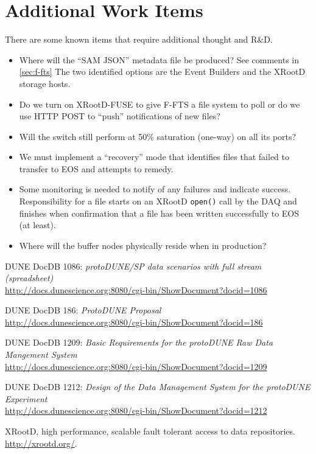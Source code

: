 \documentclass[pdftex,12pt,letter]{article}
\newcommand{\xrd}{XRootD\xspace}
\begin{document}
\section{Additional Work Items}
There are some known items that require additional thought and R\&D.
\begin{itemize}
\item Where will the ``SAM JSON'' metadata file be produced?  See comments in \ref{sec:f-fts}
The two   identified options are the Event Builders and the \xrd storage  hosts.  
\item Do we turn on \xrd-FUSE to give F-FTS a file system to poll or
  do we use HTTP POST to ``push'' notifications of new files?
\item Will the switch still perform at 50\% saturation (one-way) on
  all its ports?
\item We must implement a ``recovery'' mode that identifies files that
  failed to transfer to EOS and attempts to remedy.
\item Some monitoring is needed to notify of any failures and indicate
  success.  Responsibility for a file starts on an \xrd
  \texttt{open()} call by the DAQ and finishes when confirmation that
  a file has been written successfully to EOS (at least).  
\item Where will the buffer nodes physically reside when in production?
\end{itemize}



\begin{thebibliography}{1}
{DUNE DocDB 1086: \textit{ protoDUNE/SP data scenarios with full stream (spreadsheet)}}\\
\url{http://docs.dunescience.org:8080/cgi-bin/ShowDocument?docid=1086}

{DUNE DocDB 186: \textit{ ProtoDUNE Proposal}}\\
\url{http://docs.dunescience.org:8080/cgi-bin/ShowDocument?docid=186}


{DUNE DocDB 1209: \textit{Basic Requirements for the protoDUNE Raw Data Mangement System}}\\
\url{http://docs.dunescience.org:8080/cgi-bin/ShowDocument?docid=1209}


{DUNE DocDB 1212: \textit{Design of the Data Management System for the protoDUNE Experiment}}\\
\url{http://docs.dunescience.org:8080/cgi-bin/ShowDocument?docid=1212}



{XRootD, high performance, scalable fault tolerant access to data  repositories}.\\
  \url{http://xrootd.org/}.

\end{thebibliography}
\end{document}
